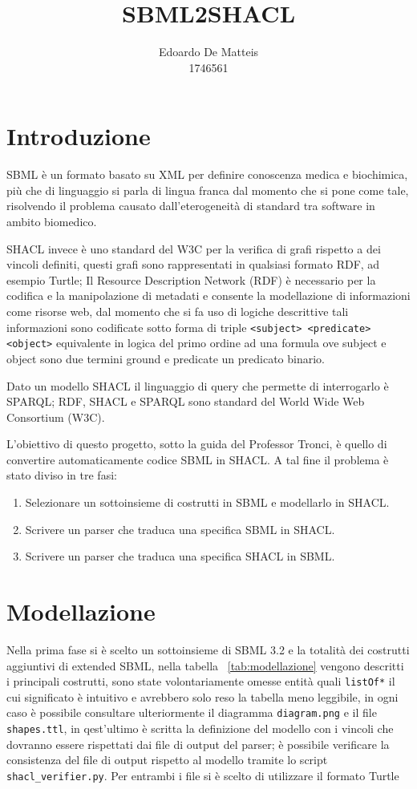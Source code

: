 \documentclass{article}
\title{SBML2SHACL}
\author{Edoardo De Matteis \\ 1746561}
\begin{document}
\maketitle
\tableofcontents

\clearpage

\section{Introduzione}
SBML è un formato basato su XML per definire conoscenza medica e biochimica, più che di linguaggio si parla di lingua franca dal momento che si pone come tale, risolvendo il problema causato dall'eterogeneità di standard tra software in ambito biomedico. 

SHACL invece è uno standard del W3C per la verifica di grafi rispetto a dei vincoli definiti, questi grafi sono rappresentati in qualsiasi formato RDF, ad esempio Turtle; Il Resource Description Network (RDF) è necessario per la codifica e la manipolazione di metadati e consente la modellazione di informazioni come risorse web, dal momento che si fa uso di logiche descrittive tali informazioni sono codificate sotto forma di triple \texttt{<subject> <predicate> <object>} equivalente in logica del primo ordine ad una formula ove subject e object sono due termini ground e predicate un predicato binario. 

Dato un modello SHACL il linguaggio di query che permette di interrogarlo è SPARQL; RDF, SHACL e SPARQL sono standard del World Wide Web Consortium (W3C). 

L'obiettivo di questo progetto, sotto la guida del Professor Tronci, è quello di convertire automaticamente codice SBML in SHACL. A tal fine il problema è stato diviso in tre fasi:

\begin{enumerate}
    \item Selezionare un sottoinsieme di costrutti in SBML e modellarlo in SHACL. 
    \item Scrivere un parser che traduca una specifica SBML in SHACL.
    \item Scrivere un parser che traduca una specifica SHACL in SBML.
\end{enumerate}

\section{Modellazione}

Nella prima fase si è scelto un sottoinsieme di SBML 3.2 e la totalità dei costrutti aggiuntivi di extended SBML, nella tabella ~\ref{tab:modellazione} vengono descritti i principali costrutti, sono state volontariamente omesse entità quali \texttt{listOf*} il cui significato è intuitivo e avrebbero solo reso la tabella meno leggibile, in ogni caso è possibile consultare ulteriormente il diagramma \texttt{diagram.png} e il file \texttt{shapes.ttl}, in qest'ultimo è scritta la definizione del modello con i vincoli che dovranno essere rispettati dai file di output del parser; è possibile verificare la consistenza del file di output rispetto al modello tramite lo script \texttt{shacl\_verifier.py}. Per entrambi i file si è scelto di utilizzare il formato Turtle 
\end{document}
